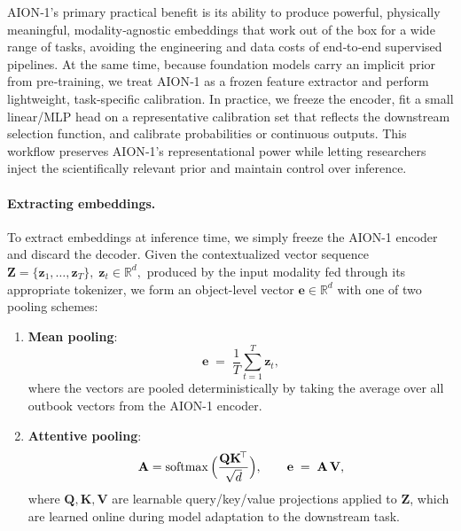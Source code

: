 \documentclass[]{polymathic}
\begin{document}
AION‑1’s primary practical benefit is its ability to produce powerful, physically meaningful, modality‑agnostic embeddings that work out of the box for a wide range of tasks, avoiding the engineering and data costs of end‑to‑end supervised pipelines. At the same time, because foundation models carry an implicit prior from pre‑training, we treat AION‑1 as a frozen feature extractor and perform lightweight, task‑specific calibration. In practice, we freeze the encoder, fit a small linear/MLP head on a representative calibration set that reflects the downstream selection function, and calibrate probabilities or continuous outputs. This workflow preserves AION‑1’s representational power while letting researchers inject the scientifically relevant prior and maintain control over inference.

\paragraph{Extracting embeddings.}  
To extract embeddings at inference time, we simply freeze the AION-1 encoder and discard the decoder.  Given the contextualized vector sequence
\(
\mathbf{Z}=\{\mathbf z_{1},\dots,\mathbf z_{T}\},\;
\mathbf z_{t}\in\mathbb{R}^{d},
\)
produced by the input modality fed through its appropriate tokenizer, we form an object-level vector $\mathbf e\in\mathbb{R}^{d}$ with one of two pooling schemes:

\begin{enumerate}
  \item \textbf{Mean pooling}:
  \begin{equation}
      \mathbf e \;=\; \frac{1}{T}\sum_{t=1}^{T}\mathbf z_{t}, 
  \end{equation}
  \label{eq:mean-pool}
  where the vectors are pooled deterministically by taking the average over all outbook vectors from the AION-1 encoder.

  \item \textbf{Attentive pooling}:
  \begin{equation}
      \mathbf A = \mathrm{softmax\ } \!\Bigl(\frac{\mathbf Q\mathbf K^{\!\top}}{\sqrt{d}}\Bigr),\qquad
      \mathbf e \;=\; \mathbf A\,\mathbf V,
  \end{equation}
  \label{eq:att-pool}
  where $\mathbf Q,\mathbf K,\mathbf V$ are learnable query/key/value projections applied to $\mathbf Z$, which are learned online during model adaptation to the downstream task.
\end{enumerate}
\end{document}
